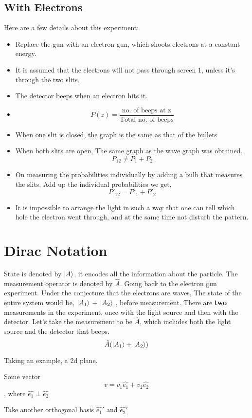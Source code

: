\documentclass{report}
\begin{document}
\subsection{With Electrons}
Here are a few details about this experiment:
\begin{itemize}
	\item Replace the gun with an electron gun, which shoots electrons at a constant energy.
	\item It is assumed that the electrons will not pass through screen 1, unless it's through the two slits.
	\item The detector beeps when an electron hits it.
	\item $$P(z) = \frac{\text{no. of beeps at z}}{\text{Total no. of beeps}} $$
	\item When one slit is closed, the graph is the same as that of the bullets
	\item When both slits are open, The same graph as the wave graph was obtained.
		\[
			P_{12} \neq P_1 + P_2
		\]
	\item On measuring the probabilities individually by adding a bulb that measures the slits, Add up the individual probabilities we get,
		\[
			P'_{12} = P'_1 + P'_2
		\]
	\item It is impossible to arrange the light in such a way that one can tell which hole the electron went through, and at the same time not disturb the pattern.
\end{itemize}
\section{Dirac Notation}

State is denoted by $\ket{A}$, it encodes all the information about the particle. The measurement operator is denoted by $\hat{A}$. Going back to the electron gun experiment. Under the conjecture that the electrons are waves, The state of the entire system would be, $\ket{A_1}$ + $\ket{A_2}$ , before measurement. There are \textbf{two} measurements in the experiment, once with the light source and then with the detector. Let's take the measurement to be $\hat{A}$, which includes both the light source and the detector that beeps. 
$$\hat{A}(\ket{A_1} + \ket{A_2})$$

Taking an example, a 2d plane.

Some vector $$\underline{v} = v_1 \hat{e_1} + v_2 \hat{e_2}$$, where $\hat{e_1} \perp \hat{e_2}$

Take another orthogonal basis $\hat{e_1}'$ and $\hat{e_2}'$
\end{document}
